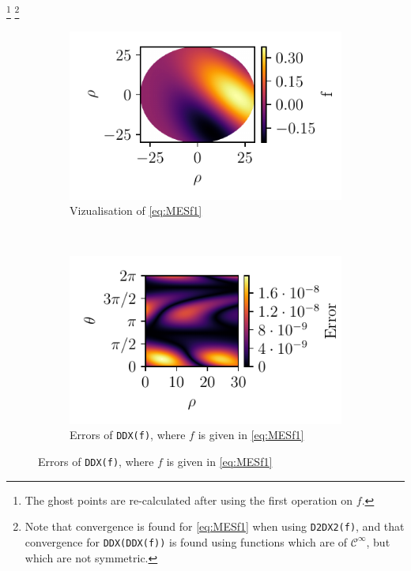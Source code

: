 %
\footnote{The ghost points are re-calculated after using the first operation on $f$.}
\footnote{Note that convergence is found for \cref{eq:MESf1} when using \texttt{D2DX2(f)}, and that convergence for \texttt{DDX(DDX(f))} is found using functions which are of $\mathcal{C}^\infty$, but which are not symmetric.\label{foot:DDXDDX}}
%
\begin{figure}[t!]
    \centering
    \begin{subfigure}[t]{0.5\textwidth}
        \centering
        \includegraphics[width=1.0\textwidth]{fig/f}
        \caption{Vizualisation of \cref{eq:MESf1}}
        \label{fig:typicalMES}
    \end{subfigure}%
    ~
    \begin{subfigure}[t]{0.5\textwidth}
        \centering
        \includegraphics[width=1.0\textwidth]{fig/err}
        \caption{Errors of \texttt{DDX(f)}, where $f$ is given in \cref{eq:MESf1}}
        \label{fig:errorsMES}
    \end{subfigure}

\end{figure}
